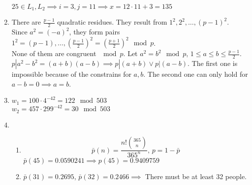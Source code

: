 \documentclass[a4paper,10pt]{extarticle}
\begin{document}
\begin{enumerate}
    $25\in L_1,L_2 \implies i=3, j=11\implies x = 12\cdot11+3= 135$
  \item
    There are $\frac{p-1}{2}$ quadratic residues. They result from $1^2,2^2,\dots,(p-1)^2$.\\
    Since $a^2=(-a)^2$, they form pairs $1^2=(p-1),\dots,(\frac{p-1}{2})^2=(\frac{p+1}{2})^2 \mod p$.\\
    None of them are congruent $\mod p$. Let $a^2=b^2 \mod p$, $1\leq a\leq b\leq\frac{p-1}{2}$.\\
    $p|a^2-b^2=(a+b)(a-b) \implies p|(a+b) \vee p|(a-b)$. The first one is impossible because of the constrains for $a,b$.
    The second one can only hold for $a-b=0 \implies a=b$.
  \item
    $w_1=100\cdot4^{-42}=122 \mod 503$\\
    $w_2=457\cdot299^{-42}=30 \mod 503$
  \item
    \begin{enumerate}
      \item
        \[\bar{p}(n)=\frac{n!\binom{365}{n}}{365^n},\, p=1-\bar{p}\]
        $\bar{p}(45)=0.0590241\implies p(45)=0.9409759$
      \item
        $\bar{p}(31)=0.2695$, $\bar{p}(32)=0.2466\implies$ There must be at least 32 people.
    \end{enumerate}
    
    
\end{enumerate}
\end{document}
